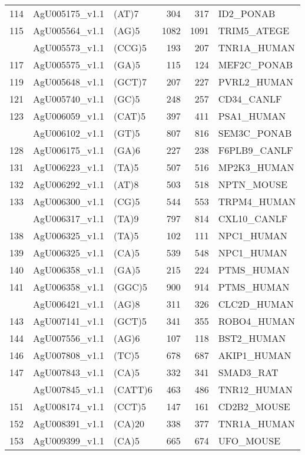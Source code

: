 \documentclass[]{article}
\begin{document}
\begin{longtable}[t]{lllrrl}
114 & AgU005175\_v1.1 & (AT)7 & 304 & 317 & ID2\_PONAB\\
115 & AgU005564\_v1.1 & (AG)5 & 1082 & 1091 & TRIM5\_ATEGE\\
\addlinespace
116 & AgU005573\_v1.1 & (CCG)5 & 193 & 207 & TNR1A\_HUMAN\\
117 & AgU005575\_v1.1 & (GA)5 & 115 & 124 & MEF2C\_PONAB\\
119 & AgU005648\_v1.1 & (GCT)7 & 207 & 227 & PVRL2\_HUMAN\\
121 & AgU005740\_v1.1 & (GC)5 & 248 & 257 & CD34\_CANLF\\
123 & AgU006059\_v1.1 & (CAT)5 & 397 & 411 & PSA1\_HUMAN\\
\addlinespace
127 & AgU006102\_v1.1 & (GT)5 & 807 & 816 & SEM3C\_PONAB\\
128 & AgU006175\_v1.1 & (GA)6 & 227 & 238 & F6PLB9\_CANLF\\
131 & AgU006223\_v1.1 & (TA)5 & 507 & 516 & MP2K3\_HUMAN\\
132 & AgU006292\_v1.1 & (AT)8 & 503 & 518 & NPTN\_MOUSE\\
133 & AgU006300\_v1.1 & (CG)5 & 544 & 553 & TRPM4\_HUMAN\\
\addlinespace
135 & AgU006317\_v1.1 & (TA)9 & 797 & 814 & CXL10\_CANLF\\
138 & AgU006325\_v1.1 & (TA)5 & 102 & 111 & NPC1\_HUMAN\\
139 & AgU006325\_v1.1 & (CA)5 & 539 & 548 & NPC1\_HUMAN\\
140 & AgU006358\_v1.1 & (GA)5 & 215 & 224 & PTMS\_HUMAN\\
141 & AgU006358\_v1.1 & (GGC)5 & 900 & 914 & PTMS\_HUMAN\\
\addlinespace
142 & AgU006421\_v1.1 & (AG)8 & 311 & 326 & CLC2D\_HUMAN\\
143 & AgU007141\_v1.1 & (GCT)5 & 341 & 355 & ROBO4\_HUMAN\\
144 & AgU007556\_v1.1 & (AG)6 & 107 & 118 & BST2\_HUMAN\\
146 & AgU007808\_v1.1 & (TC)5 & 678 & 687 & AKIP1\_HUMAN\\
147 & AgU007843\_v1.1 & (CA)5 & 332 & 341 & SMAD3\_RAT\\
\addlinespace
150 & AgU007845\_v1.1 & (CATT)6 & 463 & 486 & TNR12\_HUMAN\\
151 & AgU008174\_v1.1 & (CCT)5 & 147 & 161 & CD2B2\_MOUSE\\
152 & AgU008391\_v1.1 & (CA)20 & 338 & 377 & TNR1A\_HUMAN\\
153 & AgU009399\_v1.1 & (CA)5 & 665 & 674 & UFO\_MOUSE\\

\end{longtable}
\end{document}

